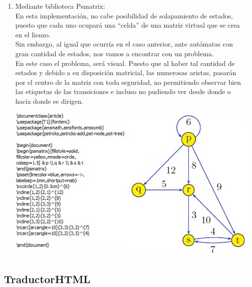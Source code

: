 \documentclass[12pt,a4paper,spanish]{book}
\begin{document}
\begin{itemize}
\begin{enumerate}
\item Mediante biblioteca Psmatrix:\\
\newline
En esta implementaci\'on, no cabe posibilidad de solapamiento de estados, puesto que cada uno ocupar\'a una ``celda'' de una matriz virtual que se crea en el lienzo.\\
Sin embargo, al igual que ocurr\'ia en el caso anterior, ante aut\'omatas con gran cantidad de estados, nos vamos a encontrar con un problema.\\
\newline
En este caso el problema, ser\'a visual. Puesto que al haber tal cantidad de estados y debido a su disposici\'on matricial, las numerosas aristas, pasar\'an por el centro de la matriz con toda seguridad, no permitiendo observar bien las etiquetas de las transiciones e incluso no pudiendo ver desde donde o hacia donde se dirigen.
\begin{center}
\includegraphics{late.jpg}
\end{center}
\end{enumerate}
\end{itemize} 
\newpage

\subsection{TraductorHTML}
\end{document}
